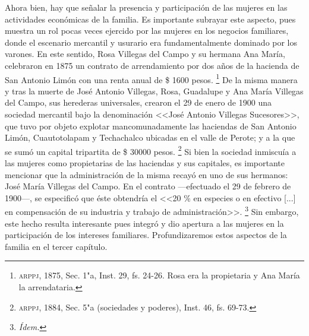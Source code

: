 \documentclass[14pt,twoside,final]{extbook} %
\let\oldfootnote\footnote
\renewcommand\footnote[1]{%
\oldfootnote{\hspace{1mm}#1}}
\begin{document}
Ahora bien, hay que señalar la presencia y participación de las mujeres en las actividades económicas de la familia. Es importante subrayar este aspecto, pues muestra un rol pocas veces ejercido por las mujeres en los negocios familiares, donde el escenario mercantil y usurario era fundamentalmente dominado por los varones. En este sentido, Rosa Villegas del Campo y su hermana Ana María, celebraron en 1875 un contrato de arrendamiento por dos años de la hacienda de San Antonio Limón con una renta anual de \$ 1600 pesos.\footnote{\textsc{arppj}, 1875, Sec. 1"a, Inst. 29, fs. 24-26. Rosa era la propietaria y Ana María la arrendataria.} De la misma manera y tras la muerte de José Antonio Villegas, Rosa, Guadalupe y Ana María Villegas del Campo, sus herederas universales, crearon el 29 de enero de 1900 una sociedad mercantil bajo la denominación <<José Antonio Villegas Sucesores>>, que tuvo por objeto explotar mancomunadamente las haciendas de San Antonio Limón, Cuautotolapam y Techachalco ubicadas en el valle de Perote; y a la que se sumó un capital tripartita de \$ 30000 pesos.\footnote{\textsc{arppj}, 1884, Sec. 5"a (sociedades y poderes), Inst. 46, fs. 69-73.} Si bien la sociedad inmiscuía a las mujeres como propietarias de las haciendas y sus capitales, es importante mencionar que la administración de la misma recayó en uno de sus hermanos: José María Villegas del Campo. En el contrato ---efectuado el 29 de febrero de 1900---, se especificó que éste obtendría el <<20 \% en especies o en efectivo [...] en compensación de su industria y trabajo de administración>>.\footnote{\em Ídem.} Sin embargo, este hecho resulta interesante pues integró y dio apertura a las mujeres en la participación de los intereses familiares. Profundizaremos estos aspectos de la familia en el tercer capítulo.
\end{document}
